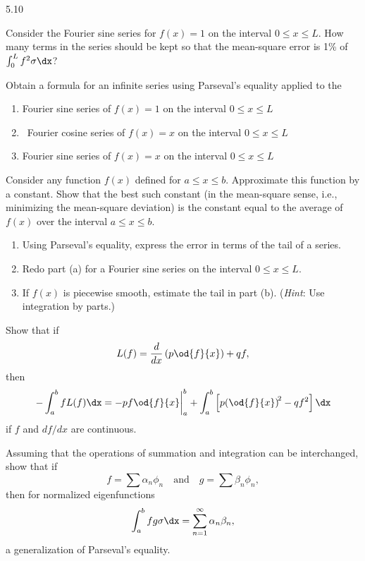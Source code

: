 \begin{exercises}{5.10}

\item Consider the Fourier sine series for $f(x) = 1$ on the interval $0 \le x \le L$.  How many terms in the series should be kept so that the mean-square error is 1\% of $\int_0^L f^2\sigma\dx$?

\item Obtain a formula for an infinite series using Parseval's equality applied to the
\begin{enumerate}
\item Fourier sine series of $f(x) = 1$ on the interval $0 \le x \le L$
\item\starred\ Fourier cosine series of $f(x) = x$ on the interval $0 \le x \le L$
\item Fourier sine series of $f(x) = x$ on the interval $0 \le x \le L$
\end{enumerate}

\item Consider any function $f(x)$ defined for $a \le x \le b$.  Approximate this function by a constant.  Show that the best such constant (in the mean-square sense, i.e., minimizing the mean-square deviation) is the constant equal to the average of $f(x)$ over the interval $a \le x \le b$.

\item
\begin{enumerate}
\item Using Parseval's equality, express the error in terms of the tail of a series.
\item Redo part (a) for a Fourier sine series on the interval $0 \le x \le L$.
\item If $f(x)$ is piecewise smooth, estimate the tail in part (b).  (\textit{Hint}: Use integration by parts.)
\end{enumerate}

\item Show that if
\[
L(f) = \frac{d}{d x}\left(p\od{f}{x}\right) + qf,
\]
then
\[
-\int_a^b fL(f)\dx = -pf\od{f}{x}\bigg|_a^b + \int_a^b \left[p\!\left(\od{f}{x}\right)^{\!2} - qf^2\right]\dx
\]
if $f$ and $df/dx$ are continuous.

\item Assuming that the operations of summation and integration can be interchanged, show that if
\[
f = \sum \alpha_n\phi_n \quad \text{and} \quad g = \sum \beta_n\phi_n,
\]
then for normalized eigenfunctions
\[
\int_a^b fg\sigma\dx = \sum_{n=1}^{\infty} \alpha_n\beta_n,
\]
a generalization of Parseval's equality.


\end{exercises}
